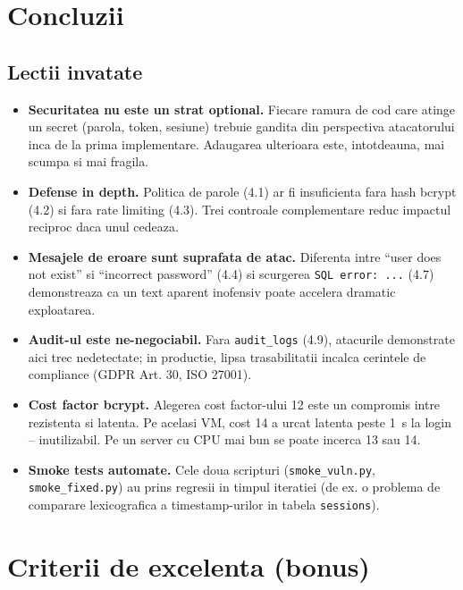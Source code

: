 \documentclass[12pt,a4paper]{article}
\begin{document}
\newpage
\section{Concluzii}\label{sec:concluzii}

\subsection{Lectii invatate}
\begin{itemize}
  \item \textbf{Securitatea nu este un strat optional.} Fiecare ramura
        de cod care atinge un secret (parola, token, sesiune) trebuie
        gandita din perspectiva atacatorului inca de la prima
        implementare. Adaugarea ulterioara este, intotdeauna, mai
        scumpa si mai fragila.
  \item \textbf{Defense in depth.} Politica de parole (4.1) ar fi
        insuficienta fara hash bcrypt (4.2) si fara rate limiting (4.3).
        Trei controale complementare reduc impactul reciproc daca unul
        cedeaza.
  \item \textbf{Mesajele de eroare sunt suprafata de atac.} Diferenta
        intre ``user does not exist'' si ``incorrect password'' (4.4)
        si scurgerea \texttt{SQL error: ...} (4.7) demonstreaza ca un
        text aparent inofensiv poate accelera dramatic exploatarea.
  \item \textbf{Audit-ul este ne-negociabil.} Fara
        \texttt{audit\_logs} (4.9), atacurile demonstrate aici trec
        nedetectate; in productie, lipsa trasabilitatii incalca
        cerintele de compliance (GDPR Art. 30, ISO 27001).
  \item \textbf{Cost factor bcrypt.} Alegerea cost factor-ului 12
        este un compromis intre rezistenta si latenta. Pe acelasi VM,
        cost 14 a urcat latenta peste 1~s la login -- inutilizabil. Pe
        un server cu CPU mai bun se poate incerca 13 sau 14.
  \item \textbf{Smoke tests automate.} Cele doua scripturi
        (\texttt{smoke\_vuln.py}, \texttt{smoke\_fixed.py}) au prins
        regresii in timpul iteratiei (de ex. o problema de comparare
        lexicografica a timestamp-urilor in tabela \texttt{sessions}).
\end{itemize}

\newpage
\section{Criterii de excelenta (bonus)}\label{sec:bonus}
\end{document}
